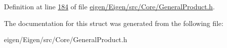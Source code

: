 Definition at line \hyperlink{eigen_2_eigen_2src_2_core_2_general_product_8h_source_l00184}{184} of file \hyperlink{eigen_2_eigen_2src_2_core_2_general_product_8h_source}{eigen/\+Eigen/src/\+Core/\+General\+Product.\+h}.



The documentation for this struct was generated from the following file\+:\begin{DoxyCompactItemize}
\item 
eigen/\+Eigen/src/\+Core/\+General\+Product.\+h\end{DoxyCompactItemize}
